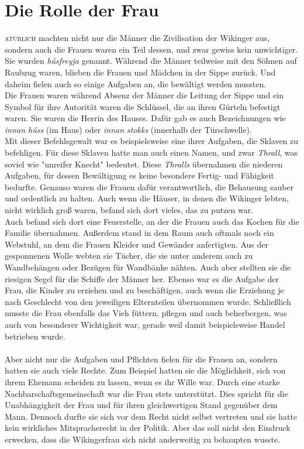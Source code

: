 \documentclass[12pt,a4paper,ngerman,openany]{book}
\newcommand{\flettrine}[2]{\lettrine[lines=2, depth=0, loversize=0.25, nindent=0.69pt, lraise=0.15]{\initfamily{#1}}{#2}}
\newcommand*\initfamily{\usefont{U}{GotIn}{xl}{n}}
\begin{document}
\section{Die Rolle der Frau}
\flettrine{N}{atürlich} machten nicht nur die Männer die Zivilisation der Wikinger aus, sondern auch die Frauen waren ein Teil dessen, und zwar gewiss kein unwichtiger. Sie wurden \textit{húsfreyja} genannt. Während die Männer teilweise mit den Söhnen auf Raubzug waren, blieben die Frauen und Mädchen in der Sippe zurück. Und daheim fielen auch so einige Aufgaben an, die bewältigt werden mussten.\\
Die Frauen waren während Absenz der Männer die Leitung der Sippe und ein Symbol für ihre Autorität waren die Schlüssel, die an ihren Gürteln befestigt waren. Sie waren die Herrin des Hauses. Dafür gab es auch Bezeichnungen wie \textit{innan húss} (im Haus) oder \textit{innan stokks} (innerhalb der Türschwelle).\\
Mit dieser Befehlsgewalt war es beispielsweise eine ihrer Aufgaben, die Sklaven zu befehligen. Für diese Sklaven hatte man auch einen Namen, und zwar \textit{Thrall}, was soviel wie "unreifer Knecht" bedeutet. Diese \textit{Thralls} übernahmen die niederen Aufgaben, für dessen Bewältigung es keine besondere Fertig- und Fähigkeit bedurfte. 
Genauso waren die Frauen dafür verantwortlich, die Behausung sauber und ordentlich zu halten. Auch wenn die Häuser, in denen die Wikinger lebten, nicht wirklich groß waren,
befand sich dort vieles, das zu putzen war.\\
Auch befand sich dort eine Feuerstelle, an der die Frauen auch das Kochen für die Familie übernahmen. Außerdem stand in dem Raum auch oftmals noch ein Webstuhl, an dem die Frauen Kleider und Gewänder anfertigten. Aus der gesponnenen Wolle webten sie Tücher, die sie unter anderem auch zu Wandbehängen oder Bezügen für Wandbänke nähten. Auch aber stellten sie die riesigen Segel für die Schiffe der Männer her.
Ebenso war es die Aufgabe der Frau, die Kinder zu erziehen und zu beschäftigen, auch wenn die Erziehung je nach Geschlecht von den jeweiligen Elternteilen übernommen wurde.
Schließlich musste die Frau ebenfalls das Vieh füttern, pflegen und auch beherbergen, was auch von besonderer Wichtigkeit war, gerade weil damit beispielsweise Handel betrieben wurde.\\\\
Aber nicht nur die Aufgaben und Pflichten fielen für die Frauen an, sondern hatten sie auch viele Rechte. Zum Beispiel hatten sie die Möglichkeit, sich von ihrem Ehemann scheiden zu lassen, wenn es ihr Wille war. Durch eine starke Nachbarschaftsgemeinschaft war die Frau stets unterstützt. Dies spricht für die Unabhängigkeit der Frau und für ihren gleichwertigen Stand gegenüber dem Mann. Dennoch durfte sie sich vor dem Recht nicht selbst vertreten und sie hatte kein wirkliches Mitspracherecht in der Politik. Aber das soll nicht den Eindruck erwecken, dass die Wikingerfrau sich nicht anderweitig zu behaupten wusste.\\
\end{document}

